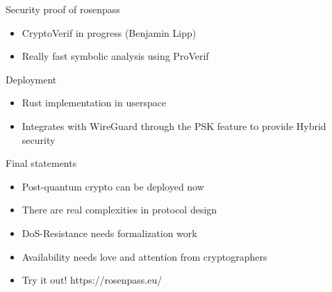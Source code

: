 \begin{frame}{Security proof of rosenpass}
  \begin{itemize}
    \item CryptoVerif in progress (Benjamin Lipp)
    \item Really fast symbolic analysis using ProVerif
  \end{itemize}
\end{frame}

\begin{frame}{Deployment}
  \begin{itemize}
    \item Rust implementation in userspace
    \item Integrates with WireGuard through the PSK feature to provide Hybrid security
  \end{itemize}
\end{frame}

\begin{frame}{Final statements}
  \begin{itemize}
    \item Post-quantum crypto can be deployed now
    \item There are real complexities in protocol design
    \item DoS-Resistance needs formalization work
    \item Availability needs love and attention from cryptographers
    \item Try it out! https://rosenpass.eu/
  \end{itemize}
\end{frame}

